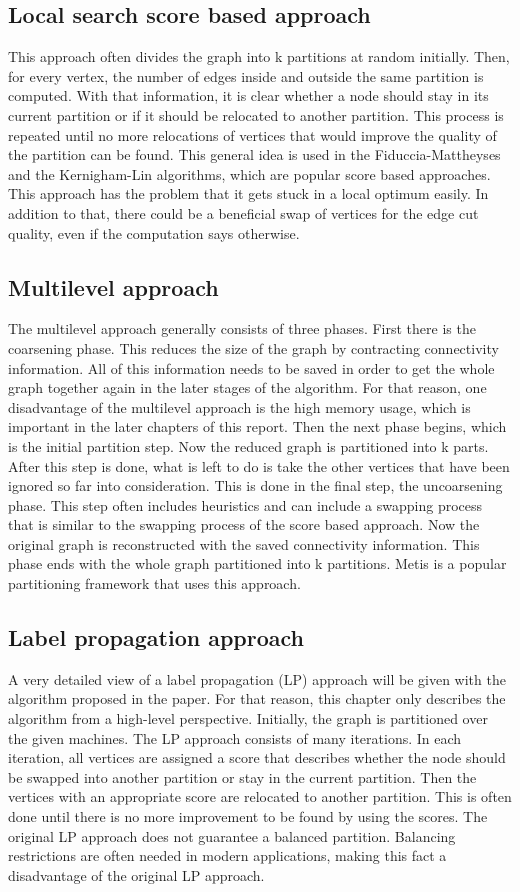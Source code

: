 \documentclass[acmsmall,nonacm,screen,review]{acmart}
\begin{document}
\subsection{Local search score based approach}
This approach often divides the graph into k partitions at random initially. Then, for every vertex, the number of edges inside and outside the same partition is computed. With that information, it is clear whether a node should stay in its current partition or if it should be relocated to another partition. This process is repeated until no more relocations of vertices that would improve the quality of the partition can be found. This general idea is used in the Fiduccia-Mattheyses \cite{FM} and the Kernigham-Lin \cite{KL} algorithms, which are popular score based approaches. This approach has the problem that it gets stuck in a local optimum easily. In addition to that, there could be a beneficial swap of vertices for the edge cut quality, even if the computation says otherwise.
\subsection{Multilevel approach}
The multilevel approach generally consists of three phases. First there is the coarsening phase. This reduces the size of the graph by contracting connectivity information. All of this information needs to be saved in order to get the whole graph together again in the later stages of the algorithm. For that reason, one disadvantage of the multilevel approach is the high memory usage, which is important in the later chapters of this report. Then the next phase begins, which is the initial partition step. Now the reduced graph is partitioned into k parts. After this step is done, what is left to do is take the other vertices that have been ignored so far into consideration. This is done in the final step, the uncoarsening phase. This step often includes heuristics and can include a swapping process that is similar to the swapping process of the score based approach. Now the original graph is reconstructed with the saved connectivity information. This phase ends with the whole graph partitioned into k partitions. Metis \cite{Metis} is a popular partitioning framework that uses this approach.
\subsection{Label propagation approach}
A very detailed view of a label propagation (LP) approach will be given with the algorithm proposed in the paper. For that reason, this chapter only describes the algorithm from a high-level perspective. Initially, the graph is partitioned over the given machines. The LP approach consists of many iterations. In each iteration, all vertices are assigned a score that describes whether the node should be swapped into another partition or stay in the current partition. Then the vertices with an appropriate score are relocated to another partition. This is often done until there is no more improvement to be found by using the scores. The original LP approach does not guarantee a balanced partition. Balancing restrictions are often needed in modern applications, making this fact a disadvantage of the original LP approach.
\end{document}
